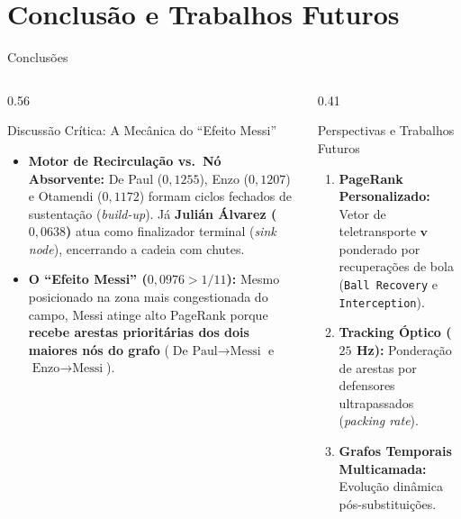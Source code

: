\documentclass[aspectratio=1610,10pt]{beamer}
\begin{document}
\section{Conclusão e Trabalhos Futuros}
\begin{frame}{Conclusões}
  \footnotesize
  \begin{columns}[T,onlytextwidth]
    \begin{column}{0.56\textwidth}
      \begin{block}{Discussão Crítica: A Mecânica do ``Efeito Messi''}
        \begin{itemize}
          \footnotesize
          \setlength{\itemsep}{4pt}
          \item \textbf{Motor de Recirculação vs.\ Nó Absorvente:} De Paul ($0{,}1255$), Enzo ($0{,}1207$) e Otamendi ($0{,}1172$) formam ciclos fechados de sustentação (\textit{build-up}). Já \textbf{Julián Álvarez ($0{,}0638$)} atua como finalizador terminal (\textit{sink node}), encerrando a cadeia com chutes.
          \item \textbf{O ``Efeito Messi'' ($0{,}0976 > 1/11$):} Mesmo posicionado na zona mais congestionada do campo, Messi atinge alto PageRank porque \textbf{recebe arestas prioritárias dos dois maiores nós do grafo} ($\text{De Paul} \to \text{Messi}$ e $\text{Enzo} \to \text{Messi}$).
        \end{itemize}
      \end{block}
    \end{column}
    \begin{column}{0.41\textwidth}
      \begin{block}{Perspectivas e Trabalhos Futuros}
        \begin{enumerate}
          \footnotesize
          \setlength{\itemsep}{4pt}
          \item \textbf{PageRank Personalizado:} Vetor de teletransporte $\mathbf{v}$ ponderado por recuperações de bola (\texttt{Ball Recovery} e \texttt{Interception}).
          \item \textbf{Tracking Óptico ($25$ Hz):} Ponderação de arestas por defensores ultrapassados (\textit{packing rate}).
          \item \textbf{Grafos Temporais Multicamada:} Evolução dinâmica pós-substituições.
        \end{enumerate}
      \end{block}
    \end{column}
  \end{columns}
\end{frame}
\end{document}
